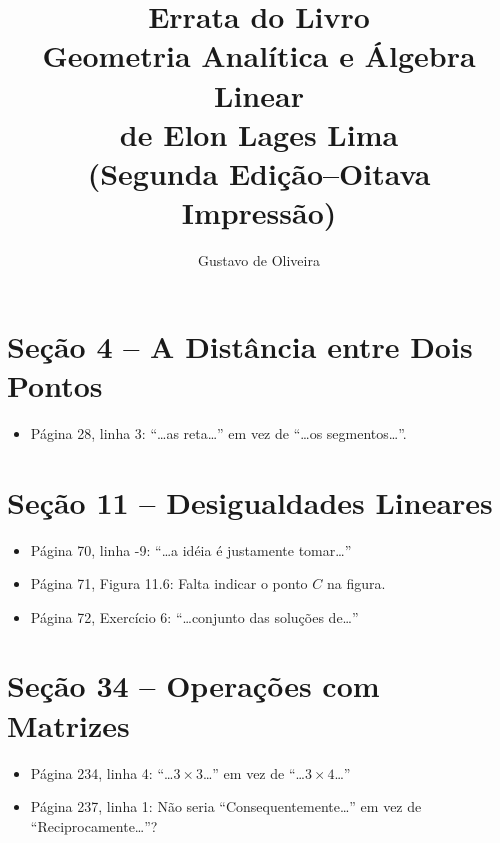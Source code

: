 \documentclass[a4paper,11pt]{article}
\title{Errata do Livro\\Geometria Analítica e Álgebra Linear\\de Elon Lages Lima\\(Segunda Edição--Oitava Impressão)}
\author{Gustavo de Oliveira}
\begin{document}
\maketitle

\section*{Seção 4 -- A Distância entre Dois Pontos}

\begin{itemize}
  \item
    Página 28, linha 3: ``\dots as reta\dots'' em vez de ``\dots os segmentos\dots''.
\end{itemize}

\section*{Seção 11 -- Desigualdades Lineares}

\begin{itemize}
  \item
    Página 70, linha -9: ``\dots a idéia é justamente tomar\dots''
  \item
    Página 71, Figura 11.6: Falta indicar o ponto $C$ na figura.
  \item
    Página 72, Exercício 6: ``\dots conjunto das soluções de\dots''
\end{itemize}

\section*{Seção 34 -- Operações com Matrizes}

\begin{itemize}
  \item
    Página 234, linha 4: ``\dots $3 \times 3$\dots'' em vez de ``\dots $3 \times 4$\dots''
  \item
    Página 237, linha 1: Não seria ``Consequentemente\dots'' em vez de ``Reciprocamente\dots''?
\end{itemize}
\end{document}
